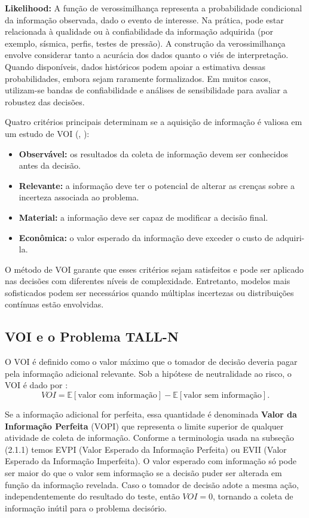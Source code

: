 \textbf{Likelihood:} A função de verossimilhança representa a probabilidade condicional da informação observada, dado o evento de interesse. Na prática, pode estar relacionada à qualidade ou à confiabilidade da informação adquirida (por exemplo, sísmica, perfis, testes de pressão). A construção da verossimilhança envolve considerar tanto a acurácia dos dados quanto o viés de interpretação. Quando disponíveis, dados históricos podem apoiar a estimativa dessas probabilidades, embora sejam raramente formalizados. Em muitos casos, utilizam-se bandas de confiabilidade e análises de sensibilidade para avaliar a robustez das decisões.

Quatro critérios principais determinam se a aquisição de informação é valiosa em um estudo de VOI (\cite{02}, \cite{03}):

\begin{itemize}
    \item \textbf{Observável:} os resultados da coleta de informação devem ser conhecidos antes da decisão.
    \item \textbf{Relevante:} a informação deve ter o potencial de alterar as crenças sobre a incerteza associada ao problema.
    \item \textbf{Material:} a informação deve ser capaz de modificar a decisão final.
    \item \textbf{Econômica:} o valor esperado da informação deve exceder o custo de adquiri-la.
\end{itemize}

O método de VOI garante que esses critérios sejam satisfeitos e pode ser aplicado nas decisões com diferentes níveis de complexidade. Entretanto, modelos mais sofisticados podem ser necessários quando múltiplas incertezas ou distribuições contínuas estão envolvidas.

\subsection{VOI e o Problema TALL-N}

O VOI é definido como o valor máximo que o tomador de decisão deveria pagar pela informação adicional relevante. Sob a hipótese de neutralidade ao risco, o VOI é dado por \cite{03}:
\begin{equation}
VOI = \mathbb{E}[\text{valor com informação}] - \mathbb{E}[\text{valor sem informação}].
\label{eq:2-6}
\end{equation}

Se a informação adicional for perfeita, essa quantidade é denominada \textbf{Valor da Informação Perfeita} (VOPI) que representa o limite superior de qualquer atividade de coleta de informação. Conforme a terminologia usada na subseção (2.1.1) temos EVPI (Valor Esperado da Informação Perfeita) ou EVII (Valor Esperado da Informação Imperfeita). O valor esperado com informação só pode ser maior do que o valor sem informação se a decisão puder ser alterada em função da informação revelada. Caso o tomador de decisão adote a mesma ação, independentemente do resultado do teste, então $VOI = 0$, tornando a coleta de informação inútil para o problema decisório.

